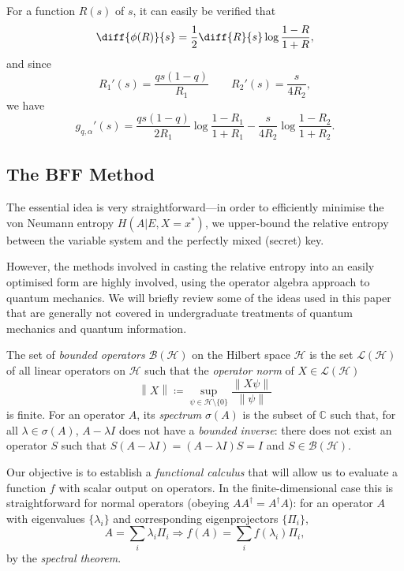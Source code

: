 \documentclass[10pt, a4paper]{article}
\newcommand{\norm}[1]{\left\lVert#1\right\rVert}
\newcommand{\?}{\mathrel{?}} %
\newcommand{\C}{\mathbb{C}} %
\newcommand{\Hs}{\mathcal{H}} %
\numberwithin{equation}{section} %
\theoremstyle{definition}
\theoremstyle{plain}
\theoremstyle{plain}
\begin{document}
    For a function \(R(s)\) of \(s\), it can easily be verified that
    \begin{equation}
      \diff{\phi(R)}{s} = \frac{1}{2} \diff{R}{s} \log\frac{1-R}{1+R},
    \end{equation}
    and since
    \begin{equation} 
      R_1'(s) = \frac{qs(1-q)}{R_1} \qquad R_2'(s) = \frac{s}{4R_2},
    \end{equation}
    we have
    \begin{equation}
      g_{q,\alpha}'(s) = \frac{qs(1-q)}{2R_1} \log\frac{1-R_1}{1+R_1} - \frac{s}{4R_2} \log\frac{1-R_2}{1+R_2}.
    \end{equation}

    \subsection{The BFF Method}

    The essential idea is very straightforward---in order to efficiently minimise the von Neumann entropy \(H(A|E, X = x^*)\), we upper-bound the relative entropy between the variable system and the perfectly mixed (secret) key. %

    However, the methods involved in casting the relative entropy into an easily optimised form are highly involved, using the operator algebra approach to quantum mechanics. We will briefly review some of the ideas used in this paper that are generally not covered in undergraduate treatments of quantum mechanics and quantum information.

    The set of \emph{bounded operators} \(\mathcal{B}(\Hs)\) on the Hilbert space \(\Hs\) is the set \(\mathcal{L}(\Hs)\) of all linear operators on \(\Hs\) such that the \emph{operator norm} of \(X \in \mathcal{L}(\Hs)\)
    \[ \norm{X} \coloneqq \sup_{\psi \in \Hs \setminus \{0\}} \frac{\norm{X\psi}}{\norm{\psi}} \]
    is finite. For an operator \(A\), its \emph{spectrum} \(\sigma(A)\) is the subset of \(\C\) such that, for all \(\lambda \in \sigma(A)\), \(A - \lambda I\) does not have a \emph{bounded inverse}: there does not exist an operator \(S\) such that \(S\left( A - \lambda I \right) = \left( A - \lambda I \right)S =  I\) and \(S \in \mathcal{B}(\Hs)\).

    Our objective is to establish a \emph{functional calculus} that will allow us to evaluate a function  \(f\) with scalar output on operators. In the finite-dimensional case this is straightforward for normal operators (obeying \(AA^{\dagger} = A^{\dagger}A\)): for an operator \(A\) with eigenvalues \(\{\lambda_i\}\) and corresponding eigenprojectors \(\{\Pi_i\}\),
    \[ A = \sum_i \lambda_i \Pi_i \Rightarrow f(A) = \sum_i f(\lambda_i) \Pi_i, \]
    by the \emph{spectral theorem}.
\end{document}
